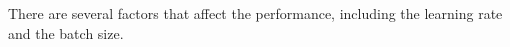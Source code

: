 There are several factors that affect the performance, including the learning rate and the batch size.
